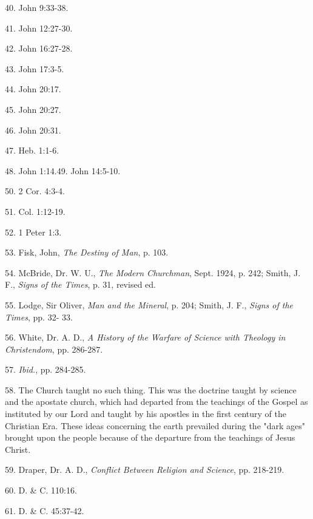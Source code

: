 40. John 9:33-38.

41. John 12:27-30.

42. John 16:27-28.

43. John 17:3-5.

44. John 20:17.

45. John 20:27.

46. John 20:31.

47. Heb. 1:1-6.

48. John 1:14.49. John 14:5-10.

50. 2 Cor. 4:3-4.

51. Col. 1:12-19.

52. 1 Peter 1:3.

53. Fisk, John, \textit{The Destiny of Man}, p. 103.

54. McBride, Dr. W. U., \textit{The Modern Churchman}, Sept. 1924, p. 242; Smith, J. F., \textit{Signs of
the Times}, p. 31, revised ed.

55. Lodge, Sir Oliver, \textit{Man and the Mineral}, p. 204; Smith, J. F., \textit{Signs of the Times}, pp. 32-
33.

56. White, Dr. A. D., \textit{A History of the Warfare of Science with Theology in Christendom}, pp.
286-287.

57. \textit{Ibid.}, pp. 284-285.

58. The Church taught no such thing. This was the doctrine taught by science and the
apostate church, which had departed from the teachings of the Gospel as instituted by our
Lord and taught by his apostles in the first century of the Christian Era. These ideas
concerning the earth prevailed during the "dark ages" brought upon the people because of the
departure from the teachings of Jesus Christ.

59. Draper, Dr. A. D., \textit{Conflict Between Religion and Science}, pp. 218-219.

60. D. \& C. 110:16.

61. D. \& C. 45:37-42.

